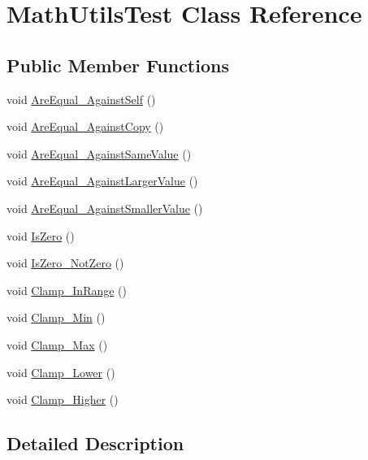 \hypertarget{class_math_utils_test}{}\section{Math\+Utils\+Test Class Reference}
\label{class_math_utils_test}
\subsection*{Public Member Functions}
\begin{DoxyCompactItemize}
\item 
void \hyperlink{class_math_utils_test_a69c93903a64ca76e35f05fe647e9e492}{Are\+Equal\+\_\+\+Against\+Self} ()
\item 
void \hyperlink{class_math_utils_test_aacd7f6c8fd799c9382ae381c1db33db7}{Are\+Equal\+\_\+\+Against\+Copy} ()
\item 
void \hyperlink{class_math_utils_test_ab942655507a29c8669c8ccd67bb81620}{Are\+Equal\+\_\+\+Against\+Same\+Value} ()
\item 
void \hyperlink{class_math_utils_test_a77e56b4e5fcd3e9dfe120a265ded0fe1}{Are\+Equal\+\_\+\+Against\+Larger\+Value} ()
\item 
void \hyperlink{class_math_utils_test_ae94e968da42fc6c4bb90bafa5ab57947}{Are\+Equal\+\_\+\+Against\+Smaller\+Value} ()
\item 
void \hyperlink{class_math_utils_test_a516ab46e7d3d37bf326caddd90e6cd09}{Is\+Zero} ()
\item 
void \hyperlink{class_math_utils_test_a23e9b9f59ca752cd49b285b3fdb3b615}{Is\+Zero\+\_\+\+Not\+Zero} ()
\item 
void \hyperlink{class_math_utils_test_a6f3d4029313d99797fc2f84ffc483d80}{Clamp\+\_\+\+In\+Range} ()
\item 
void \hyperlink{class_math_utils_test_aac8d35342b4acb267d1788f041cfd372}{Clamp\+\_\+\+Min} ()
\item 
void \hyperlink{class_math_utils_test_aac4f4fa5f05d08e8867109cc2e0562c0}{Clamp\+\_\+\+Max} ()
\item 
void \hyperlink{class_math_utils_test_a3d1816b2cc2aea8d79831a6b01af292f}{Clamp\+\_\+\+Lower} ()
\item 
void \hyperlink{class_math_utils_test_ae689520235fddf0156df1adeba2e1002}{Clamp\+\_\+\+Higher} ()
\end{DoxyCompactItemize}


\subsection{Detailed Description}


